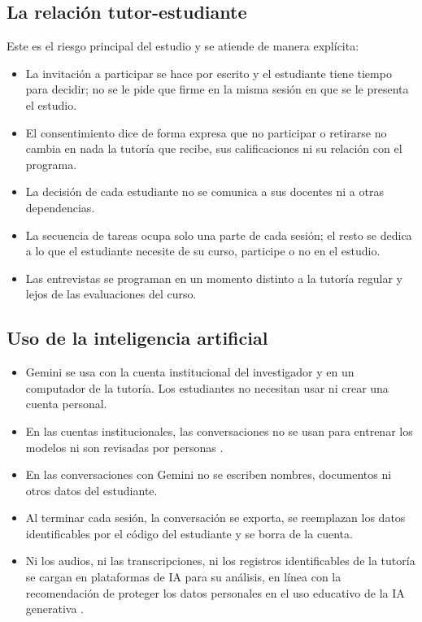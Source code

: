 \subsection{La relación tutor-estudiante}

Este es el riesgo principal del estudio y se atiende de manera explícita:

\begin{itemize}
\item La invitación a participar se hace por escrito y el estudiante tiene tiempo para decidir; no se le pide que firme en la misma sesión en que se le presenta el estudio.
\item El consentimiento dice de forma expresa que no participar o retirarse no cambia en nada la tutoría que recibe, sus calificaciones ni su relación con el programa.
\item La decisión de cada estudiante no se comunica a sus docentes ni a otras dependencias.
\item La secuencia de tareas ocupa solo una parte de cada sesión; el resto se dedica a lo que el estudiante necesite de su curso, participe o no en el estudio.
\item Las entrevistas se programan en un momento distinto a la tutoría regular y lejos de las evaluaciones del curso.
\end{itemize}

\subsection{Uso de la inteligencia artificial}

\begin{itemize}
\item Gemini se usa con la cuenta institucional del investigador y en un computador de la tutoría. Los estudiantes no necesitan usar ni crear una cuenta personal.
\item En las cuentas institucionales, las conversaciones no se usan para entrenar los modelos ni son revisadas por personas \parencite{google2025workspaceedu}.
\item En las conversaciones con Gemini no se escriben nombres, documentos ni otros datos del estudiante.
\item Al terminar cada sesión, la conversación se exporta, se reemplazan los datos identificables por el código del estudiante y se borra de la cuenta.
\item Ni los audios, ni las transcripciones, ni los registros identificables de la tutoría se cargan en plataformas de IA para su análisis, en línea con la recomendación de proteger los datos personales en el uso educativo de la IA generativa \parencite{unesco2023guia}.
\end{itemize}


